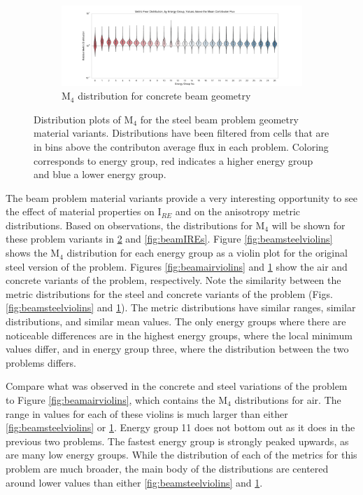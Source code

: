 \begin{figure}[htb!]\ContinuedFloat
  \centering
  \begin{subfigure}[t]{\textwidth}
    \includegraphics[width=\linewidth]{./chapters/characterization_probs/figures/char/prob1v2/metric_four_violin_mean.pdf}
    \caption{M$_4$ distribution for concrete beam geometry}
    \label{fig:beamconcreteviolins}
  \end{subfigure}
  \caption[Distribution plots of M$_4$ for the steel beam problem geometry
  material variants.]{Distribution plots of M$_4$ for the steel beam problem
  geometry material variants. Distributions have been filtered from cells that
  are in bins above the contributon average flux in each problem. Coloring
corresponds to energy group, red indicates a higher energy group and blue a
lower energy group. }
  \label{fig:beamviolins}
\end{figure}

The beam problem material variants provide a very interesting opportunity to see
the effect of material properties on I$_{RE}$ and on the anisotropy metric
distributions. Based on observations, the distributions for M$_4$ will be shown
for these problem variants in \ref{fig:beamviolins} and \ref{fig:beamIREs}.
Figure \ref{fig:beamsteelviolins} shows the M$_4$ distribution for each energy
group as a violin plot for the original steel version of the problem.
Figures \ref{fig:beamairviolins} and \ref{fig:beamconcreteviolins} show the air
and concrete variants of the problem, respectively. Note the similarity between
the metric distributions for the steel and concrete variants of the problem
(Figs. \ref{fig:beamsteelviolins} and \ref{fig:beamconcreteviolins}). The metric
distributions have similar ranges, similar distributions, and similar mean
values. The only energy groups where there are noticeable differences are in the
highest energy groups, where the local minimum values differ, and in energy
group three, where the distribution between the two problems differs.

Compare
what was observed in the concrete and steel variations of the problem
to Figure \ref{fig:beamairviolins}, which contains the M$_4$ distributions
for air. The range in values for each of these violins is much larger than
either \ref{fig:beamsteelviolins} or \ref{fig:beamconcreteviolins}. Energy group
11 does not bottom out as it does in the previous two problems. The fastest
energy group is strongly peaked upwards, as are many low energy groups. While
the distribution of each of the metrics for this problem are much broader, the
main body of the distributions are centered around lower values than either
\ref{fig:beamsteelviolins} and \ref{fig:beamconcreteviolins}.

